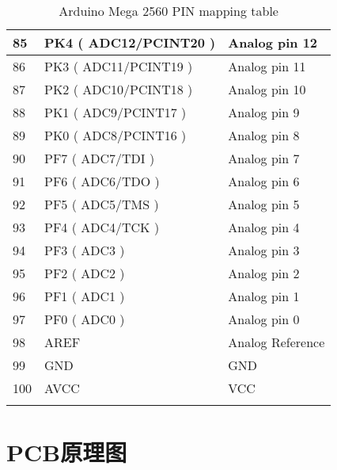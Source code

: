 \begin{longtable}[c]{|l|l|l|}
    85         & PK4 ( ADC12/PCINT20 )    & Analog pin 12         \\ \hline
    86         & PK3 ( ADC11/PCINT19 )    & Analog pin 11         \\ \hline
    87         & PK2 ( ADC10/PCINT18 )    & Analog pin 10         \\ \hline
    88         & PK1 ( ADC9/PCINT17 )     & Analog pin 9          \\ \hline
    89         & PK0 ( ADC8/PCINT16 )     & Analog pin 8          \\ \hline
    90         & PF7 ( ADC7/TDI )         & Analog pin 7          \\ \hline
    91         & PF6 ( ADC6/TDO )         & Analog pin 6          \\ \hline
    92         & PF5 ( ADC5/TMS )         & Analog pin 5          \\ \hline
    93         & PF4 ( ADC4/TCK )         & Analog pin 4          \\ \hline
    94         & PF3 ( ADC3 )             & Analog pin 3          \\ \hline
    95         & PF2 ( ADC2 )             & Analog pin 2          \\ \hline
    96         & PF1 ( ADC1 )             & Analog pin 1          \\ \hline
    97         & PF0 ( ADC0 )             & Analog pin 0          \\ \hline
    98         & AREF                     & Analog Reference      \\ \hline
    99         & GND                      & GND                   \\ \hline
    100        & AVCC                     & VCC                   \\ \hline
    \caption{Arduino Mega 2560 PIN mapping table}
    \label{tab:PinMap}\\
\end{longtable}

\section{PCB原理图}



